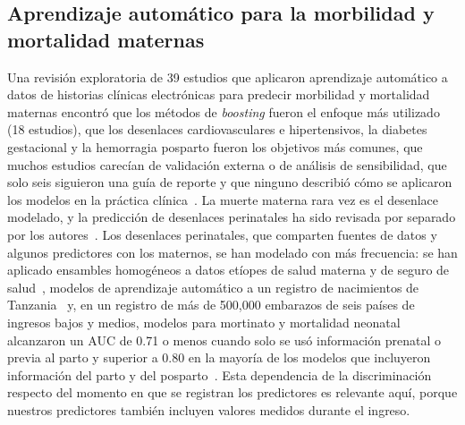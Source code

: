 \documentclass[healthcare,article,submit,pdftex,moreauthors]{Definitions/mdpi_es}
\begin{document}
\subsection{Aprendizaje automático para la morbilidad y mortalidad maternas}
Una revisión exploratoria de 39 estudios que aplicaron aprendizaje automático a datos de
historias clínicas electrónicas para predecir morbilidad y mortalidad maternas encontró
que los métodos de \emph{boosting} fueron el enfoque más utilizado (18 estudios), que los
desenlaces cardiovasculares e hipertensivos, la diabetes gestacional y la hemorragia
posparto fueron los objetivos más comunes, que muchos estudios carecían de validación
externa o de análisis de sensibilidad, que solo seis siguieron una guía de reporte y que
ninguno describió cómo se aplicaron los modelos en la práctica clínica~\cite{Vasudevan2025Scoping}.
La muerte materna rara vez es el desenlace modelado, y la predicción de desenlaces
perinatales ha sido revisada por separado por los autores~\cite{gutierrezjimenez2026artificial}. Los desenlaces perinatales, que comparten
fuentes de datos y algunos predictores con los maternos, se han modelado con más frecuencia: se han aplicado ensambles homogéneos a datos etíopes de salud materna y de
seguro de salud~\cite{Bogale2022Perinatal}, modelos de aprendizaje automático a un registro de nacimientos de Tanzania~\cite{Mboya2020Perinatal} y, en un registro de más de 500{,}000
embarazos de seis países de ingresos bajos y medios, modelos para mortinato y mortalidad neonatal alcanzaron un AUC de 0.71 o menos cuando solo se usó información
prenatal o previa al parto y superior a 0.80 en la mayoría de los modelos que incluyeron información del parto y del posparto~\cite{Shukla2020Perinatal}. Esta dependencia de la
discriminación respecto del momento en que se registran los predictores es relevante aquí, porque nuestros predictores también incluyen valores medidos durante el ingreso.
\end{document}

